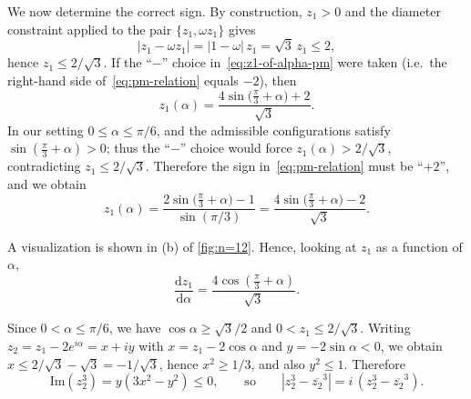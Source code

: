 \documentclass{article}
\theoremstyle{definition}
\let\le\leqslant
\let\ge\geqslant
\renewcommand*{\Im}{\mathrm{Im}}
\begin{document}
We now determine the correct sign.
By construction, $z_1>0$ and the diameter constraint applied to the pair $\{z_1,\omega z_1\}$ gives
\[
|z_1-\omega z_1|=|1-\omega|\,z_1=\sqrt3\,z_1\le 2,
\]
hence $z_1\le 2/\sqrt3$.
If the ``$-$'' choice in~\eqref{eq:z1-of-alpha-pm} were taken (i.e.\ the right-hand side of~\eqref{eq:pm-relation} equals $-2$),
then
\[
z_1(\alpha)=\frac{4\sin\bigl(\frac{\pi}{3}+\alpha\bigr)+2}{\sqrt3}.
\]In our setting $0\le \alpha\le \pi/6$, and the admissible configurations satisfy $\sin(\frac{\pi}{3}+\alpha)>0$; thus the ``$-$'' choice would force
$z_1(\alpha)>2/\sqrt3$, contradicting $z_1\le 2/\sqrt3$.
Therefore the sign in~\eqref{eq:pm-relation} must be ``$+2$'', and we obtain
\begin{equation}\label{eq:z1-of-alpha}
z_1(\alpha)=\frac{2\sin\bigl(\frac{\pi}{3}+\alpha\bigr)-1}{\sin(\pi/3)}
=\frac{4\sin\bigl(\frac{\pi}{3}+\alpha\bigr)-2}{\sqrt3}.
\end{equation}











A visualization is shown in (b) of \cref{fig:n=12}.
Hence, looking at \(z_1\) as a function of \(\alpha\),
\[
\frac{\mathrm{d} z_1}{\mathrm{d} \alpha}= \frac{4 \cos \left(\frac{\pi}{3} +\alpha\right) }{\sqrt{3}}.
\]

Since $0<\alpha\le \pi/6$, we have $\cos\alpha\ge \sqrt3/2$ and $0<z_1\le 2/\sqrt3$. Writing $z_2=z_1-2e^{i\alpha}=x+iy$ with $x=z_1-2\cos\alpha$ and $y=-2\sin\alpha<0$, we obtain
$x\le 2/\sqrt3-\sqrt3=-1/\sqrt3$, hence $x^2\ge 1/3$, and also $y^2\le 1$.
Therefore
\[
\Im(z_2^3)=y(3x^2-y^2)\le 0,
\qquad\text{so}\qquad
|z_2^3-\overline{z_2}^3|=i\,(z_2^3-\overline{z_2}^3).
\]
\end{document}
